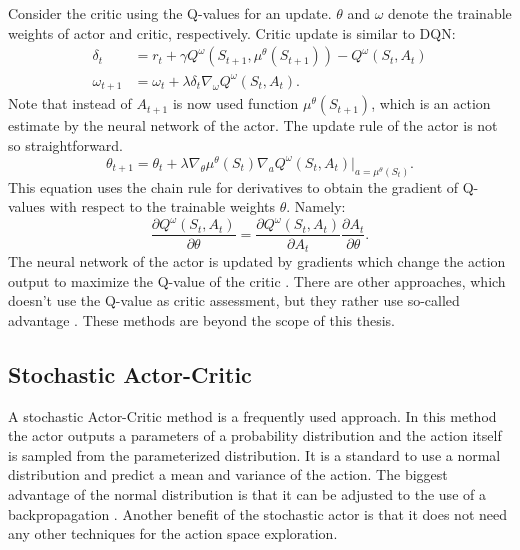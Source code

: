 Consider the critic using the Q-values for an update. $\theta$ and $\omega$ denote the trainable weights of actor and critic, respectively. Critic update is similar to DQN:
\begin{align}
\delta_t &= r_t + \gamma Q^\omega(S_{t+1}, \mu ^\theta (S_{t+1})) - Q^\omega(S_t, A_t)\\
\omega_{t+1} &= \omega_t + \lambda \delta_t \nabla_\omega Q^\omega(S_t, A_t).
\end{align}
Note that instead of $A_{t+1}$ is now used function $\mu^\theta(S_{t+1})$, which is an action estimate by the neural network of the actor. The update rule of the actor is not so straightforward. 
\begin{equation}
\theta_{t+1} = \theta_t + \lambda\nabla_\theta \mu^\theta(S_t)\nabla_a Q^\omega (S_t, A_t)|_{a = \mu^\theta(S_t)}.
\end{equation}
This equation uses the chain rule for derivatives to obtain the gradient of Q-values with respect to the trainable weights $\theta$. Namely:
\begin{equation}
\frac{\partial Q^\omega(S_t, A_t)}{\partial \theta} = \frac{\partial Q^\omega(S_t, A_t)}{\partial A_t} \frac{\partial A_t}{\partial \theta}.
\end{equation}
The neural network of the actor is updated by gradients which change the action output to maximize the Q-value of the critic \cite{silver2014}.
There are other approaches, which doesn't use the Q-value as critic assessment, but they rather use so-called advantage \cite{schulman2017}. These methods are beyond the scope of this thesis. 
\clearpage
\subsection{Stochastic Actor-Critic}
A stochastic Actor-Critic method is a frequently used approach. In this method the actor outputs a parameters of a probability distribution and the action itself is sampled from the parameterized distribution. It is a standard to use a normal distribution and predict a mean and variance of the action. The biggest advantage of the normal distribution is that it can be adjusted to the use of a backpropagation \cite{hess2015}. Another benefit of the stochastic actor is that it does not need any other techniques for the action space exploration.

